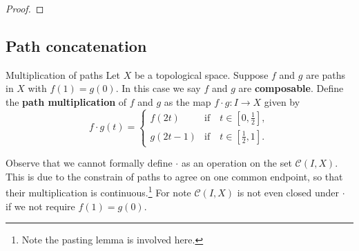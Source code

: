 \begin{proof}
    

\end{proof}



\subsection*{Path concatenation}

\begin{definition}{Multiplication of paths}{}
    Let \(X\) be a topological space. Suppose \(f\) and \(g\) are paths in \(X\) with \(f(1)=g(0)\). In this case we say \(f\) and \(g\) are \textbf{composable}.
    Define   the \textbf{path multiplication} of \(f\) and \(g\) as the map \(f\cdot g\colon I\to X\) given by 
      \[
        f \cdot g (t)= \begin{cases}
            f(2t)   &\text{if}\quad t\in [0,\frac{1}{2}],\\
            g(2t-1) &\text{if}\quad t\in [\frac{1}{2},1].
        \end{cases}
    \] 
\end{definition}

Observe that we cannot formally define \(\cdot\) as an operation on the set \(\mathcal{C}(I,X)\). This is due to the constrain of paths  to agree on one common endpoint, so that their multiplication is continuous.\footnote{Note the pasting lemma is involved here. } For note \(\mathcal{C}(I,X)\) is not even closed under \(\cdot\)  if we not require \(f(1)=g(0)\). 


